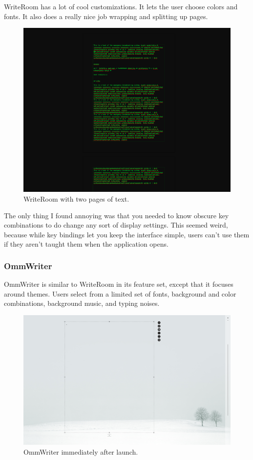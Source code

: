 \documentclass[10pt]{article}
\begin{document}
WriteRoom has a lot of cool customizations. It lets the user choose colors and fonts. It also does a really nice job wrapping and splitting up pages.

\begin{figure}
   \centering
      \includegraphics[width=130mm]{images/writeroom2.png}
   \caption{WriteRoom with two pages of text.}
\end{figure}

The only thing I found annoying was that you needed to know obscure key combinations to do change any sort of display settings. This seemed weird, because while key bindings let you keep the interface simple, users can't use them if they aren't taught them when the application opens.

\subsubsection{OmmWriter}

OmmWriter \cite{ommwriter} is similar to WriteRoom in its feature set, except that it focuses around themes. Users select from a limited set of fonts, background and color combinations, background music, and typing noises.

\begin{figure}
   \centering
      \includegraphics[width=130mm]{images/ommwriter1.png}
   \caption{OmmWriter immediately after launch.}
\end{figure}
\end{document}
